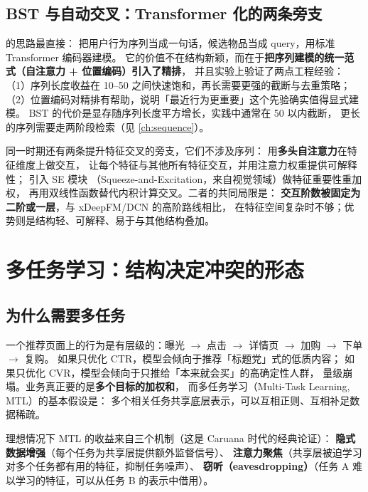 \subsection{BST 与自动交叉：Transformer 化的两条旁支}

 的思路最直接：
把用户行为序列当成一句话，候选物品当成 query，用标准 Transformer 编码器建模。
它的价值不在结构新颖，而在于\textbf{把序列建模的统一范式（自注意力 + 位置编码）引入了精排}，
并且实验上验证了两点工程经验：
（1）序列长度收益在 10--50 之间快速饱和，再长需要更强的截断与去重策略；
（2）位置编码对精排有帮助，说明「最近行为更重要」这个先验确实值得显式建模。
BST 的代价是显存随序列长度平方增长，实践中通常在 50 以内截断，
更长的序列需要走两阶段检索（见 \cref{ch:sequence}）。

同一时期还有两条提升特征交叉的旁支，它们不涉及序列：
 用\textbf{多头自注意力}在特征维度上做交互，
让每个特征与其他所有特征交互，并用注意力权重提供可解释性；
 引入 SE 模块
（Squeeze-and-Excitation，来自视觉领域）做特征重要性重加权，
再用双线性函数替代内积计算交叉。二者的共同局限是：
\textbf{交互阶数被固定为二阶或一层}，与 xDeepFM/DCN 的高阶路线相比，
在特征空间复杂时不够；优势则是结构轻、可解释、易于与其他结构叠加。

\section{多任务学习：结构决定冲突的形态}

\subsection{为什么需要多任务}

一个推荐页面上的行为是有层级的：曝光 $\to$ 点击 $\to$ 详情页 $\to$ 加购 $\to$ 下单 $\to$ 复购。
如果只优化 CTR，模型会倾向于推荐「标题党」式的低质内容；
如果只优化 CVR，模型会倾向于只推给「本来就会买」的高确定性人群，
量级崩塌。业务真正要的是\textbf{多个目标的加权和}，
而多任务学习（Multi-Task Learning, MTL）的基本假设是：
多个相关任务共享底层表示，可以互相正则、互相补足数据稀疏。

理想情况下 MTL 的收益来自三个机制（这是 Caruana 时代的经典论证）：
\textbf{隐式数据增强}（每个任务为共享层提供额外监督信号）、
\textbf{注意力聚焦}（共享层被迫学习对多个任务都有用的特征，抑制任务噪声）、
\textbf{窃听（eavesdropping）}（任务 A 难以学习的特征，可以从任务 B 的表示中借用）。

